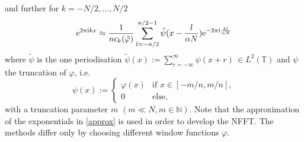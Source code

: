 \documentclass[journal]{IEEEtran}
\def\ti{\mbox{\scriptsize{\rm i}}}
\newcommand{\eip}[1]{{\rm e}^{ 2\pi{\ti} #1}}
\newcommand{\eim}[1]{{\rm e}^{-2\pi{\ti} #1}}
\numberwithin{equation}{section}
\numberwithin{table}{section}
\numberwithin{figure}{section}
\begin{document}
and further for $k=-N/2,\ldots,N/2$
\begin{equation} \label{approx}
\eip{kx}
\approx
\frac{1}{nc_{ k} (\tilde \varphi )}
\sum_{l=-n/2}^{n/2-1}
\tilde\psi (x-\frac{l}{\alpha N})  \eim{\frac{kl}{\alpha N}}
\end{equation}
where $\tilde\psi$ is the one periodisation 
$
\displaystyle\tilde\psi(x) := \sum_{r=-\infty}^{\infty} \psi(x +r)\,
\in L^2(\mathbb{T})
$
and $\psi$ the truncation of $\varphi$, i.e.
\begin{equation}\label{Defpsi}
\psi(x) := \left\{
\begin{array}{ll}
\varphi(x) & \textrm{if }  x \in [- m/n,m/n], \\
0 & \textrm{else},
\end{array} \right.
\end{equation}
with a truncation parameter $m$ $(m\ll N,m\in \mathbb{N})$. 
Note that the approximation of the exponentials in \eqref{approx} is
used in order to develop the NFFT. The methods differ only by choosing
different window functions $\varphi$. 
\end{document}
